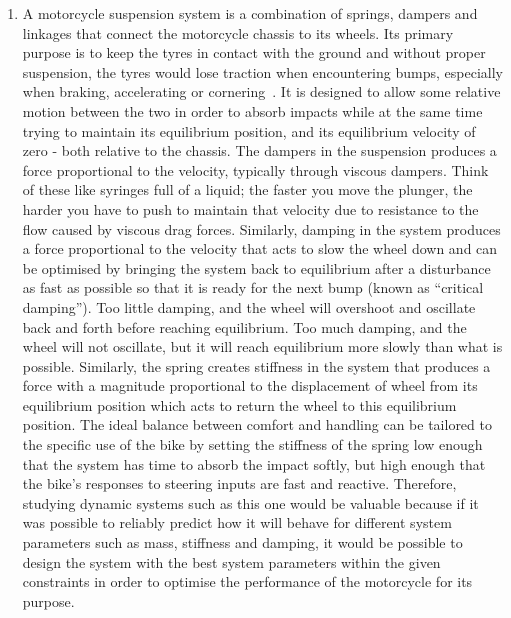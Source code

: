 \documentclass[12pt]{article}
\begin{document}
    \begin{enumerate}
        \item A motorcycle suspension system is a combination of springs, dampers and linkages that connect the motorcycle chassis to its wheels.
        Its primary purpose is to keep the tyres in contact with the ground and without proper suspension, the tyres would lose traction when encountering bumps, especially when braking, accelerating or cornering~\cite{UTI2020MotorcycleSuspension}.
        It is designed to allow some relative motion between the two in order to absorb impacts while at the same time trying to maintain its equilibrium position, and its equilibrium velocity of zero - both relative to the chassis.
        The dampers in the suspension produces a force proportional to the velocity, typically through viscous dampers.
        Think of these like syringes full of a liquid; the faster you move the plunger, the harder you have to push to maintain that velocity due to resistance to the flow caused by viscous drag forces.
        Similarly, damping in the system produces a force proportional to the velocity that acts to slow the wheel down and can be optimised by bringing the system back to equilibrium after a disturbance as fast as possible so that it is ready for the next bump (known as ``critical damping'').
        Too little damping, and the wheel will overshoot and oscillate back and forth before reaching equilibrium.
        Too much damping, and the wheel will not oscillate, but it will reach equilibrium more slowly than what is possible.
        Similarly, the spring creates stiffness in the system that produces a force with a magnitude proportional to the displacement of wheel from its equilibrium position which acts to return the wheel to this equilibrium position.
        The ideal balance between comfort and handling can be tailored to the specific use of the bike by setting the stiffness of the spring low enough that the system has time to absorb the impact softly, but high enough that the bike's responses to steering inputs are fast and reactive.
        Therefore, studying dynamic systems such as this one would be valuable because if it was possible to reliably predict how it will behave for different system parameters such as mass, stiffness and damping, it would be possible to design the system with the best system parameters within the given constraints in order to optimise the performance of the motorcycle for its purpose.


\end{enumerate}
\end{document}
